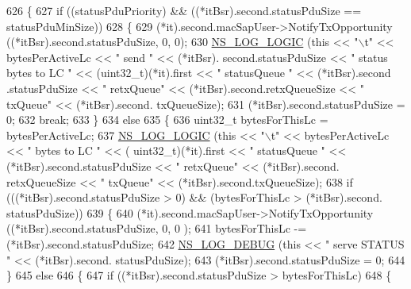\begin{DoxyCode}
626                 \{
627                   \textcolor{keywordflow}{if} ((statusPduPriority) && ((*itBsr).second.statusPduSize == statusPduMinSize))
628                     \{
629                       (*it).second.macSapUser->NotifyTxOpportunity ((*itBsr).second.statusPduSize, 0, 0);
630                       \hyperlink{group__logging_ga88acd260151caf2db9c0fc84997f45ce}{NS\_LOG\_LOGIC} (\textcolor{keyword}{this} << \textcolor{stringliteral}{"\(\backslash\)t"} << bytesPerActiveLc << \textcolor{stringliteral}{" send  "} << (*itBsr).
      second.statusPduSize << \textcolor{stringliteral}{" status bytes to LC "} << (uint32\_t)(*it).first << \textcolor{stringliteral}{" statusQueue "} << (*itBsr).second
      .statusPduSize << \textcolor{stringliteral}{" retxQueue"} << (*itBsr).second.retxQueueSize << \textcolor{stringliteral}{" txQueue"} <<  (*itBsr).second.
      txQueueSize);
631                       (*itBsr).second.statusPduSize = 0;
632                       \textcolor{keywordflow}{break};
633                     \}
634                   \textcolor{keywordflow}{else}
635                     \{
636                       uint32\_t bytesForThisLc = bytesPerActiveLc;
637                       \hyperlink{group__logging_ga88acd260151caf2db9c0fc84997f45ce}{NS\_LOG\_LOGIC} (\textcolor{keyword}{this} << \textcolor{stringliteral}{"\(\backslash\)t"} << bytesPerActiveLc << \textcolor{stringliteral}{" bytes to LC "} << (
      uint32\_t)(*it).first << \textcolor{stringliteral}{" statusQueue "} << (*itBsr).second.statusPduSize << \textcolor{stringliteral}{" retxQueue"} << (*itBsr).second.
      retxQueueSize << \textcolor{stringliteral}{" txQueue"} <<  (*itBsr).second.txQueueSize);
638                       \textcolor{keywordflow}{if} (((*itBsr).second.statusPduSize > 0) && (bytesForThisLc > (*itBsr).second.
      statusPduSize))
639                         \{
640                           (*it).second.macSapUser->NotifyTxOpportunity ((*itBsr).second.statusPduSize, 0, 0
      );
641                           bytesForThisLc -= (*itBsr).second.statusPduSize;
642                           \hyperlink{group__logging_ga413f1886406d49f59a6a0a89b77b4d0a}{NS\_LOG\_DEBUG} (\textcolor{keyword}{this} << \textcolor{stringliteral}{" serve STATUS "} << (*itBsr).second.
      statusPduSize);
643                           (*itBsr).second.statusPduSize = 0;
644                         \}
645                       \textcolor{keywordflow}{else}
646                         \{
647                           \textcolor{keywordflow}{if} ((*itBsr).second.statusPduSize > bytesForThisLc)
648                             \{

\end{DoxyCode}
